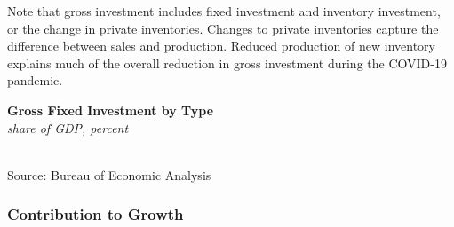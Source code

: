 \documentclass{report}
\makeatletter
\newcommand{\tbllink}[1]{\href{https://raw.githubusercontent.com/bdecon/US-chartbook/master/chartbook/data/#1}{\faTable}}
\newcommand*\short[1]{\expandafter\@gobbletwo\number\numexpr#1\relax}
\newcommand{\stdnode}[3]{\node[below, align=left, shift=({#1,#2})]{#3};}
\newcommand{\shdateaxisticks}{
		date coordinates in=x, axis line style={draw=none},
		xmax={2023-11-01},
		max space between ticks=40,	    
		xtick={{1990-01-01}, {1995-01-01}, {2000-01-01}, 
			{2005-01-01}, {2010-01-01}, {2015-01-01}, {2020-01-01}},
		minor xtick={},
		enlarge y limits={0.06}, enlarge x limits={0.01},
		}
\newcommand{\bbar}[2]{extra #1 ticks = {{#2}}, extra #1 tick labels = ,
		extra #1 tick style = {grid=major, grid style={thick, black!25}},}
\newcommand{\stdline}[4]{\addplot[very thick, no markers, color=#1] 
		table [x=#2, y=#3, col sep=comma] {#4};	}
\newcommand{\rbars}{
		\fill[color=black!10] (axis cs:{1990-07-01},\pgfkeysvalueof{/pgfplots/ymin}) rectangle 
			(axis cs:{1991-03-01}, \pgfkeysvalueof{/pgfplots/ymax});
		\fill[color=black!10] (axis cs:{2007-12-01},\pgfkeysvalueof{/pgfplots/ymin}) rectangle 
			(axis cs:{2009-07-01}, \pgfkeysvalueof{/pgfplots/ymax});
		\fill[color=black!10] (axis cs:{2001-03-01},\pgfkeysvalueof{/pgfplots/ymin}) rectangle 
			(axis cs:{2001-11-01}, \pgfkeysvalueof{/pgfplots/ymax});
		\fill[color=black!10] (axis cs:{2020-02-01},\pgfkeysvalueof{/pgfplots/ymin}) rectangle 
			(axis cs:{2020-05-01}, \pgfkeysvalueof{/pgfplots/ymax});}
\makeatother
\begin{document}
{\begin{minipage}{0.76\textwidth}   
\small Note that gross investment includes fixed investment and inventory investment, or the \href{https://www.bea.gov/help/glossary/change-private-inventories-cipi}{change in private inventories}. Changes to private inventories capture the difference between sales and production. Reduced production of new inventory explains much of the overall reduction in gross investment during the COVID-19 pandemic. 
\end{minipage}
\newpage
\begin{minipage}{0.3\textwidth}
\small 
\end{minipage} \hspace{6mm}
\begin{minipage}{0.41\textwidth}
\normalsize \textbf{Gross Fixed Investment by Type}\\
\footnotesize{\textit{share of GDP, percent}}\\
\hspace*{-2mm} \\
\footnotesize{Source: Bureau of Economic Analysis} \hfill \tbllink{businvsh.csv}
\end{minipage}

\begin{minipage}{0.76\textwidth}
\subsubsection*{Contribution to Growth}
\vspace{-0.5mm}
\small  
\vspace{1mm}


\end{minipage}}
\end{document}
